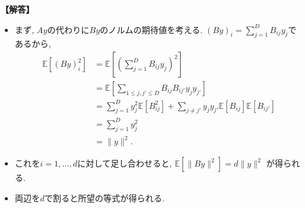 \documentclass[12pt,a4paper]{article}
\newenvironment{solution}{
    \vspace{0.5em}
    \noindent
    \textbf{【解答】}
    \vspace{0.3em}
}{
    \vspace{1em}
}
\begin{document}
\begin{solution}
\begin{itemize}
  \item まず, $Ay$の代わりに$By$のノルムの期待値を考える. $(By)_i=\sum_{j=1}^D B_{ij} y_j$であるから,
  \begin{align*}
    \mathbb{E}[(By)_i^2] &= \mathbb{E}\left[\left(\sum_{j=1}^D B_{ij} y_j\right)^2\right] \\
    &= \mathbb{E}\left[\sum_{1\le j,j'\le D} B_{ij}B_{ij'} y_j y_{j'}\right] \\
    &= \sum_{j=1}^D y_j^2 \mathbb{E}[B_{ij}^2] + \sum_{j\ne j'} y_j y_{j'} \mathbb{E}[B_{ij}]\mathbb{E}[B_{ij'}] \\
    &= \sum_{j=1}^D y_j^2 \\
    &= \|y\|^2.
  \end{align*}
  \item これを$i=1,\dots,d$に対して足し合わせると, $\mathbb{E}[\|By\|^2] = d \|y\|^2$ が得られる.
  \item 両辺を$d$で割ると所望の等式が得られる.
\end{itemize}
\end{solution}
\end{document}

